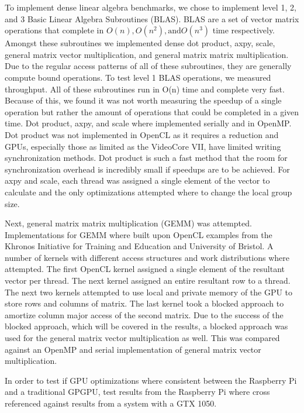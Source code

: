 \documentclass[conference]{IEEEtran}
\begin{document}
To implement dense linear algebra benchmarks, we chose to implement level 1, 2, and 3 Basic Linear Algebra Subroutines (BLAS). 
BLAS are a set of vector matrix operations that complete in \(O(n), O(n^2), \text{and} O(n^3)\) time respectively. Amongst these 
subroutines we implemented dense dot product, axpy, scale, general matrix vector multiplication, and general matrix matrix multiplication.
Due to the regular access patterns of all of these subroutines, they are generally compute bound operations. To test level 1 
BLAS operations, we measured throughput. All of these subroutines run in O(n) time and complete very fast. Because of this, 
we found it was not worth measuring the speedup of a single operation but rather the amount of operations that could be completed in 
a given time. Dot product, axpy, and scale where implemented serially and in OpenMP. Dot product was not implemented in OpenCL 
as it requires a reduction and GPUs, especially those as limited as the VideoCore VII, have limited writing synchronization
methods. Dot product is such a fast method that the room for synchronization overhead is incredibly small if speedups are to 
be achieved. For axpy and scale, each thread was assigned a single element of the vector to calculate and the only optimizations 
attempted where to change the local group size.

Next, general matrix matrix multiplication (GEMM) was attempted. Implementations for GEMM where built upon OpenCL examples from 
the Khronos Initiative for Training and Education and University of Bristol. A number of kernels with different access structures 
and work distributions where attempted. The first OpenCL kernel assigned a single element of the resultant vector per thread.
The next kernel assigned an entire resultant row to a thread. The next two kernels attempted to use local and private memory of 
the GPU to store rows and columns of matrix. The last kernel took a blocked approach to amortize column major access of the second matrix.
Due to the success of the blocked approach, which will be covered in the results, a blocked approach was used for the general matrix vector 
multiplication as well. This was compared against an OpenMP and serial implementation of general matrix vector multiplication.

In order to test if GPU optimizations where consistent between the Raspberry Pi and a traditional GPGPU, test results from the 
Raspberry Pi where cross referenced against results from a system with a GTX 1050.
\end{document}
